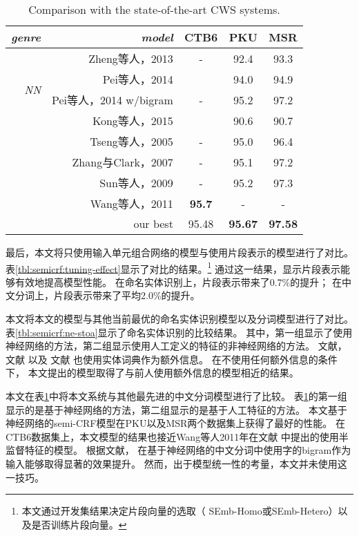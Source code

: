 \begin{table}[t]
	\centering
	\setlength{\tabcolsep}{5.4pt}
	\begin{tabular}{r|r||c c c}
		\hline
		\it genre & \it model & CTB6 & PKU & MSR \\
		\hline
		\multirow{4}{*}{\it NN} & Zheng等人，2013\cite{zheng-chen-xu:2013:EMNLP} & - & 92.4 & 93.3 \\
		& Pei等人，2014\cite{pei-ge-chang:2014:P14-1} & & 94.0 & 94.9 \\
		& Pei等人，2014\cite{pei-ge-chang:2014:P14-1} w/bigram & - & 95.2 & 97.2 \\
		& Kong等人，2015\cite{DBLP:journals/corr/KongDS15} & & 90.6 & 90.7 \\
		\hdashline[1pt/3pt]
		\multirow{4}{*}{\it non-NN} & Tseng等人，2005\cite{Tseng05aconditional} & - & 95.0 & 96.4 \\
		& Zhang与Clark，2007\cite{zhang-clark:2007:ACLMain} & - & 95.1 & 97.2 \\
		& Sun等人，2009\cite{sun-EtAl:2009:NAACLHLT09} & - & 95.2 & 97.3 \\
		& Wang等人，2011{\tiny }\cite{wang-EtAl:2011:IJCNLP-2011} &\bf 95.7 & - & - \\
		\hline
		\multicolumn{2}{r||}{our best} & 95.48 &\bf 95.67 &\bf 97.58 \\
		\hline
	\end{tabular}
	\caption{Comparison with the state-of-the-art CWS systems.}\label{tbl:semicrf:cws-stoa}
\end{table}

最后，本文将只使用输入单元组合网络的模型与使用片段表示的模型进行了对比。
表\ref{tbl:semicrf:tuning-effect}显示了对比的结果。\footnote{
	本文通过开发集结果决定片段向量的选取（ SEmb-Homo或SEmb-Hetero）以及是否训练片段向量。}
通过这一结果，显示片段表示能够有效地提高模型性能。
在命名实体识别上，片段表示带来了0.7\%的提升；
在中文分词上，片段表示带来了平均2.0\%的提升。

本文将本文的模型与其他当前最优的命名实体识别模型以及分词模型进行了对比。
表\ref{tbl:semicrf:ne-stoa}显示了命名实体识别的比较结果。
其中，第一组显示了使用神经网络的方法，第二组显示使用人工定义的特征的非神经网络的方法。
文献，
文献
以及
文献
也使用实体词典作为额外信息。 
在不使用任何额外信息的条件下，
本文提出的模型取得了与前人使用额外信息的模型相近的结果。

本文在表\ref{tbl:semicrf:cws-stoa}中将本文系统与其他最先进的中文分词模型进行了比较。
表\ref{tbl:semicrf:cws-stoa}的第一组显示的是基于神经网络的方法，第二组显示的是基于人工特征的方法。
本文基于神经网络的semi-CRF模型在PKU以及MSR两个数据集上获得了最好的性能。
在CTB6数据集上，本文模型的结果也接近Wang等人2011年在文献 
中提出的使用半监督特征的模型。
根据文献，
在基于神经网络的中文分词中使用字的bigram作为输入能够取得显著的效果提升。
然而，出于模型统一性的考量，本文并未使用这一技巧。

